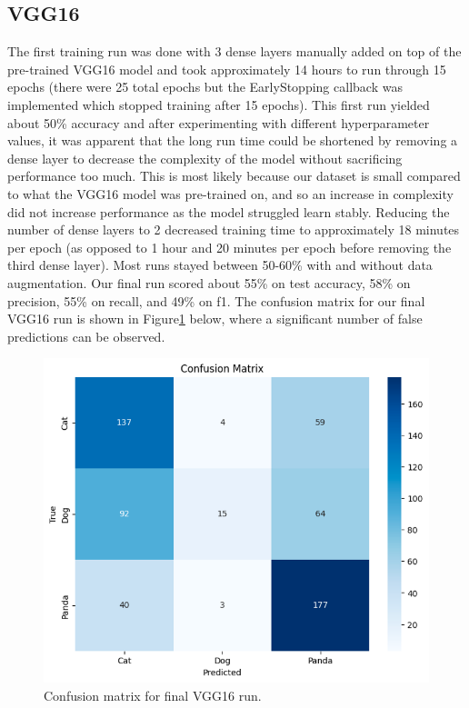 \subsection{VGG16}
The first training run was done with 3 dense layers manually added on top of the pre-trained VGG16 model and took approximately 14 hours to run through 15 epochs (there were 25 total epochs but the EarlyStopping callback was implemented which stopped training after 15 epochs). 
This first run yielded about 50\% accuracy and after experimenting with different hyperparameter values, it was apparent that the long run time could be shortened by removing a dense layer to decrease the complexity of the model without sacrificing performance too much. 
This is most likely because our dataset is small compared to what the VGG16 model was pre-trained on, and so an increase in complexity did not increase performance as the model struggled learn stably. 
Reducing the number of dense layers to 2 decreased training time to approximately 18 minutes per epoch (as opposed to 1 hour and 20 minutes per epoch before removing the third dense layer). 
Most runs stayed between 50-60\% with and without data augmentation. 
Our final run scored about 55\% on test accuracy, 58\% on precision, 55\% on recall, and 49\% on f1. 
The confusion matrix for our final VGG16 run is shown in Figure\ref{fig:figure10} below, where a significant number of false predictions can be observed. 

\begin{figure}[h]
	\centering
	\includegraphics[scale=0.4]{VGG16_cfm}
	\caption{Confusion matrix for final VGG16 run.}
	\label{fig:figure10}
\end{figure}